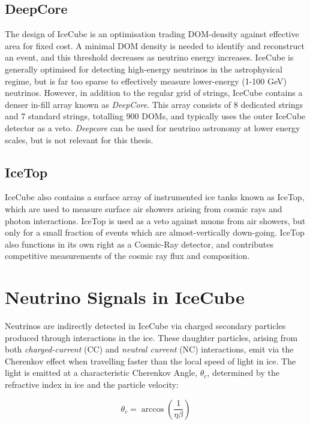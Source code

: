 \subsection*{DeepCore}

The design of IceCube is an optimisation trading DOM-density against effective area for fixed cost. A minimal DOM density is needed to identify and reconstruct an event, and this threshold decreases as neutrino energy increases. IceCube is generally optimised for detecting high-energy neutrinos in the astrophysical regime, but is far too sparse to effectively measure lower-energy (1-100 GeV) neutrinos. However, in addition to the regular grid of strings, IceCube contains a denser in-fill array known as \emph{DeepCore}. This array consists of 8 dedicated strings and 7 standard strings, totalling 900 DOMs, and typically uses the outer IceCube detector as a veto. \textit{Deepcore} can be used for neutrino astronomy at lower energy scales, but is not relevant for this thesis.

\subsection*{IceTop}

IceCube also contains a surface array of instrumented ice tanks known as IceTop, which are used to measure surface air showers arising from cosmic rays and photon interactions. IceTop is used as a veto against muons from air showers, but only for a small fraction of events which are almost-vertically down-going. IceTop also functions in its own right as a Cosmic-Ray detector, and contributes competitive measurements of the cosmic ray flux and composition.

\section{Neutrino Signals in IceCube}
\label{sec:nu_signal}

Neutrinos are indirectly detected in IceCube via charged secondary particles produced through interactions in the ice. These daughter particles, arising from both \emph{charged-current} (CC) and \emph{neutral current} (NC) interactions, emit via the Cherenkov effect when travelling faster than the local speed of light in ice. The light is emitted at a characteristic Cherenkov Angle, $\theta_{c}$, determined by the refractive index in ice and the particle velocity:

\begin{equation}
	\theta_{c} =  \arccos \left( \frac{1}{\eta \beta} \right)
\end{equation}

